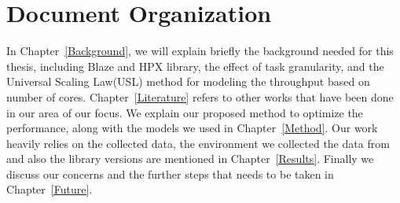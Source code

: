 \section{Document Organization}
In Chapter~\ref{Background}, we will explain briefly the background needed for this thesis, including Blaze and HPX library, the effect of task granularity, and the Universal Scaling Law(USL) method for modeling the throughput based on number of cores.  
Chapter~\ref{Literature} refers to other works that have been done in our area of our focus. We explain our proposed method to optimize the performance, along with the models we used in Chapter~\ref{Method}. Our work heavily relies on the collected data, the environment we collected the data from and also the library versions are mentioned in Chapter~\ref{Results}.
Finally we discuss our concerns and the further steps that needs to be taken in Chapter~\ref{Future}.

\vspace{\baselineskip}
